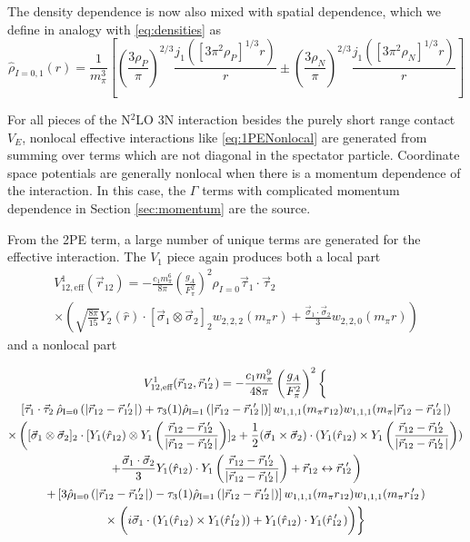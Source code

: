 \documentclass[%
 preprint,
 amsmath,amssymb,
 aps,
]{revtex4-1}
\newcommand{\rhohat}[2]{\hat{\rho}_{\text{I}=#1}\left( #2 \right)}
\newcommand{\rot}{\vec{r}_{12}}
\newcommand{\rotp}{\vec{r}_{12}\!\!\!'\,\,}
\newcommand{\rotpr}{r_{12}\!\!\!\!'\,\,\,}
\newcommand{\rotphat}{\hat{r}_{12}\!\!\!\!'\,\,\,}
\newcommand{\taudot}{\vec{\tau}_1\cdot\vec{\tau}_2}
\newcommand{\sigmadot}{\vec{\sigma}_1\cdot\vec{\sigma}_2}
\newcommand{\sigmatwo}{[\vec{\sigma}_1\otimes\vec{\sigma}_2]_2}
\newcommand{\sigmacross}{\vec{\sigma}_1\times\vec{\sigma}_2}
\newcommand{\fracphantom}{\vphantom{\frac{1}{1}}}
\newcommand{\w}[4]{w_{#1,#2,#3}(#4)}
\begin{document}
The density dependence is now also mixed with spatial dependence, which we define in analogy with \eqref{eq:densities} as 
\begin{equation}\label{eq:hatdensities}
\hat{\rho}_{I=0,1}(r)=%
\frac{1}{m_\pi^3}\left[ \left(\frac{3 \rho_P}{\pi}\right)^{2/3} \frac{ j_1( [3\pi^2 \rho_P]^{1/3}  r)}{ r} \pm \left(\frac{3 \rho_N}{\pi}\right)^{2/3} \frac{ j_1( [3\pi^2 \rho_N]^{1/3}  r)}{ r} \right]
\end{equation}

For all pieces of the N$^2$LO 3N interaction besides the purely short range contact $V_E$, nonlocal effective interactions like \eqref{eq:1PENonlocal} are generated from summing over terms which are not diagonal in the spectator particle. Coordinate space potentials are generally nonlocal when there is a momentum dependence of the interaction. In this case, the $\Gamma$ terms with complicated momentum dependence in Section \ref{sec:momentum} are the source.

From the 2PE term, a large number of unique terms are generated for the effective interaction. The $V_1$ piece again produces both a local part 
\begin{multline}
V^{1}_{12,\text{eff}}(\rot)=-\frac{c_1 m_\pi^6}{8\pi}\left(\frac{g_A}{F_\pi^2}\right)^2 \rho_{I=0}\taudot\:\\
 \times\left(\sqrt{\frac{8\pi}{15}}Y_2(\hat{r})\cdot\sigmatwo \w{2}{2}{2}{m_\pi r} +\frac{\sigmadot}{3}  \w{2}{2}{0}{m_\pi r} \right)
\end{multline}
and a nonlocal part 

\begin{multline}
V^{1}_{12,\text{eff}}(\rot,\rotp)=-\frac{c_1 m_\pi^9}{48\pi} \left(\frac{g_A}{F_\pi^2}\right)^2 
\left\{ \vphantom{\frac{1}{3}} \right. \\
\left[ \taudot \: \rhohat{0}{|\rot-\rotp|} + \tau_3(1) \rhohat{1}{|\rot-\rotp|} \right] \w{1}{1}{1}{m_\pi r_{12}} \w{1}{1}{1}{m_\pi | \rot-\rotp | }\\
\times \left( \sigmatwo \cdot [ Y_1 (\hat{r}_{12}) \otimes Y_1 \left(\frac{\rot-\rotp}{|\rot-\rotp|}\right) ]_2
 +\frac{1}{2}(\sigmacross)\cdot (Y_1 (\hat{r}_{12}) \times Y_1 \left(\frac{\rot-\rotp}{|\rot-\rotp|}\right) ) \right. \\
\left.+\frac{\sigmadot}{3} Y_1 (\hat{r}_{12}) \cdot Y_1 \left(\frac{\rot-\rotp}{|\rot-\rotp|}\right)
+\rot\leftrightarrow\rotp\right) \\
+\left[3\rhohat{0}{|\rot-\rotp|}-\tau_3(1)\rhohat{1}{|\rot-\rotp|}\right] \w{1}{1}{1}{m_\pi r_{12}} \w{1}{1}{1}{m_\pi \rotpr} \\
\times\left.\left(i\vec{\sigma}_1 \cdot (Y_1 (\hat{r}_{12}) \times Y_1(\rotphat)) + Y_1 (\hat{r}_{12}) \cdot Y_1(\rotphat) \fracphantom \right)
\right\}
\end{multline}
\end{document}
